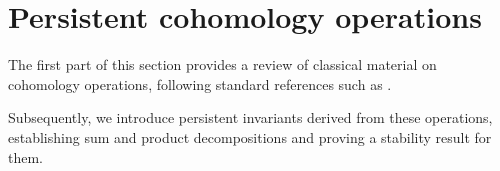 
\section{Persistent cohomology operations}\label{s:steenrod}

The first part of this section provides a review of classical material on cohomology operations, following standard references such as \cite{steenrod1962cohomology, mosheroperations1968, may1970general}.

Subsequently, we introduce persistent invariants derived from these operations, establishing sum and product decompositions and proving a stability result for them.




